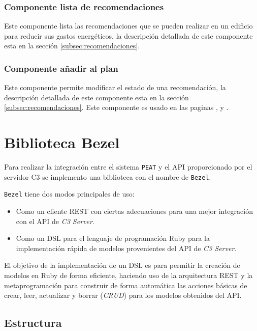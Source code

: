 \subsubsection{Componente lista de recomendaciones}

Este componente lista las recomendaciones que se pueden realizar en un edificio para
reducir sus gastos energéticos, la descripción detallada de este componente esta en
la sección \ref{subsec:recomendaciones}.

\subsubsection{Componente añadir al plan}

Este componente permite modificar el estado de una recomendación,
la descripción detallada de este componente esta en la sección
\ref{subsec:recomendaciones}. Este componente es usado en las paginas
,  y
.

\section{Biblioteca Bezel}

Para realizar la integración entre el sistema \texttt{PEAT} y el API proporcionado
por el servidor C3 se implemento una biblioteca con el nombre de \texttt{Bezel}.

\texttt{Bezel} tiene dos modos principales de uso:
\begin{itemize}
\item Como un cliente REST con ciertas adecuaciones para una mejor
  integración con el API de \textit{C3 Server}.
\item Como un DSL para el lenguaje de programación Ruby para la implementación rápida
  de modelos provenientes del API de \textit{C3 Server}.
\end{itemize}

El objetivo de la implementación de un DSL es para permitir la creación de modelos
en Ruby de forma eficiente, haciendo uso de la arquitectura REST y la
metaprogramación para construir de forma automática las acciones básicas de crear,
leer, actualizar y borrar (\textit{CRUD}) para los modelos obtenidos del API.

\subsection{Estructura}


